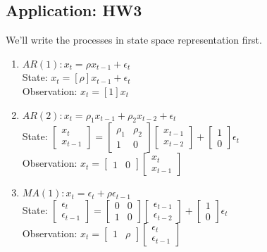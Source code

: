 \documentclass[12pt]{article}
\begin{document}
\subsection{Application: HW3}
We'll write the processes in state space representation first.
\begin{enumerate}
\item $AR(1): x_t = \rho x_{t-1} + \epsilon_t$ \\

State: \hspace{4mm} $x_t = [\rho]x_{t-1} + \epsilon_t$ \\
Observation: $ x_t = [1]x_t$

\item $AR(2): x_t = \rho_1 x_{t-1} + \rho_2 x_{t-2} + \epsilon_t$\\

State: \hspace{4mm} $\begin{bmatrix} x_t \\ x_{t-1} \end{bmatrix} 
= \begin{bmatrix} 
\rho_1 & \rho_2 \\ 
1 & 0
\end{bmatrix}
\begin{bmatrix}
x_{t-1} \\ x_{t-2}
\end{bmatrix} + \begin{bmatrix}
1 \\ 0
\end{bmatrix} \epsilon_t $ \\
Observation: $ x_t = \begin{bmatrix} 1 & 0\end{bmatrix} \begin{bmatrix}x_t \\ x_{t-1}\end{bmatrix}$

\item $MA(1): x_t = \epsilon_t + \rho \epsilon_{t-1}$\\

State: \hspace{4mm} $\begin{bmatrix} \epsilon_t \\ \epsilon_{t-1} \end{bmatrix} 
= \begin{bmatrix} 
0 & 0 \\ 
1 & 0
\end{bmatrix}
\begin{bmatrix}
\epsilon_{t-1} \\ \epsilon_{t-2}
\end{bmatrix} + \begin{bmatrix}
1 \\ 0
\end{bmatrix} \epsilon_t $ \\
Observation: $ x_t = \begin{bmatrix} 1 & \rho \end{bmatrix} \begin{bmatrix}\epsilon_t \\ \epsilon_{t-1}\end{bmatrix}$


\end{enumerate}
\end{document}
